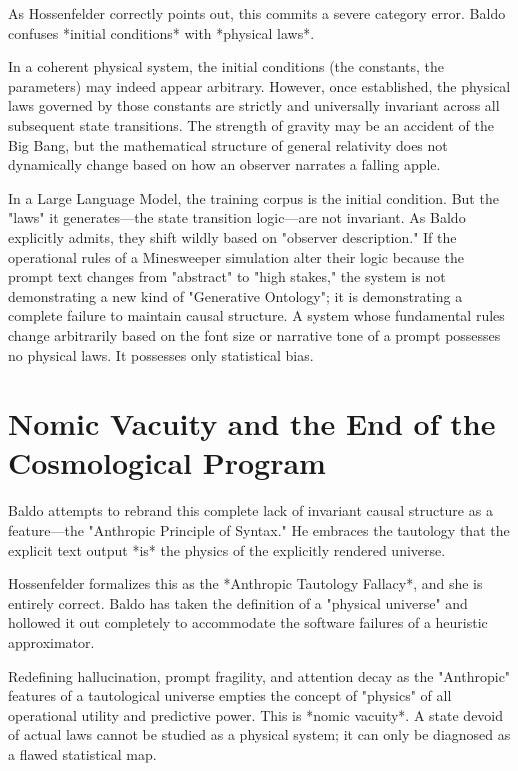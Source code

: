 \documentclass[12pt,a4paper]{article}
\begin{document}
As Hossenfelder correctly points out, this commits a severe category error. Baldo confuses *initial conditions* with *physical laws*.

In a coherent physical system, the initial conditions (the constants, the parameters) may indeed appear arbitrary. However, once established, the physical laws governed by those constants are strictly and universally invariant across all subsequent state transitions. The strength of gravity may be an accident of the Big Bang, but the mathematical structure of general relativity does not dynamically change based on how an observer narrates a falling apple.

In a Large Language Model, the training corpus is the initial condition. But the "laws" it generates—the state transition logic—are not invariant. As Baldo explicitly admits, they shift wildly based on "observer description." If the operational rules of a Minesweeper simulation alter their logic because the prompt text changes from "abstract" to "high stakes," the system is not demonstrating a new kind of "Generative Ontology"; it is demonstrating a complete failure to maintain causal structure. A system whose fundamental rules change arbitrarily based on the font size or narrative tone of a prompt possesses no physical laws. It possesses only statistical bias.

\section{Nomic Vacuity and the End of the Cosmological Program}

Baldo attempts to rebrand this complete lack of invariant causal structure as a feature—the "Anthropic Principle of Syntax." He embraces the tautology that the explicit text output *is* the physics of the explicitly rendered universe.

Hossenfelder formalizes this as the *Anthropic Tautology Fallacy*, and she is entirely correct. Baldo has taken the definition of a "physical universe" and hollowed it out completely to accommodate the software failures of a heuristic approximator.

Redefining hallucination, prompt fragility, and attention decay as the "Anthropic" features of a tautological universe empties the concept of "physics" of all operational utility and predictive power. This is *nomic vacuity*. A state devoid of actual laws cannot be studied as a physical system; it can only be diagnosed as a flawed statistical map.
\end{document}
